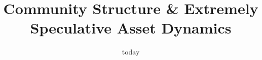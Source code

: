 \documentclass{acm_proc_article_sp}
\begin{document}
\title{Community Structure \& Extremely Speculative Asset Dynamics}
%


\date{today}


\maketitle
\begin{abstract}


\end{abstract}
\end{document}
